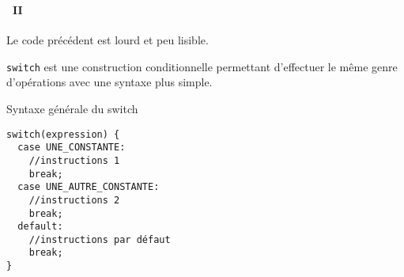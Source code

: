 \begin{frame}[containsverbatim]
  \frametitle{\secname}
  \framesubtitle{\subsecname~II}

  Le code précédent est lourd et peu lisible.
  \vspace{0.3cm}
  \par
  \verb|switch| est une construction conditionnelle permettant d'effectuer le même genre d'opérations avec une syntaxe plus simple.
  {\footnotesize\begin{block}{Syntaxe générale du switch}
    \begin{verbatim}
switch(expression) {
  case UNE_CONSTANTE:
    //instructions 1
    break;
  case UNE_AUTRE_CONSTANTE:
    //instructions 2
    break;
  default:
    //instructions par défaut
    break;
}\end{verbatim}
  \end{block}}
\end{frame}

